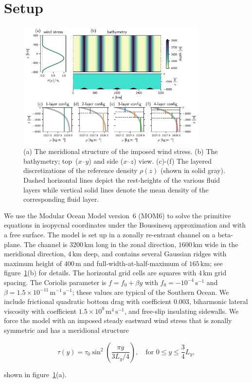 \documentclass{agujournal2019}
\begin{document}
\section{Setup}

\begin{figure}[t]
\centering
\noindent\includegraphics[width=0.85\textwidth]{domaindensities}
\vspace*{-1em}\caption{(a) The meridional structure of the imposed wind stress. (b) The bathymetry; top~($x$--$y$) and side ($x$--$z$) view. (c)-(f) The layered discretizations of the reference density $\rho(z)$ (shown in solid gray). Dashed horizontal lines depict the rest-heights of the various fluid layers while vertical solid lines denote the mean density of the corresponding fluid layer.}\label{fig:domain}\vspace*{-4em}
\end{figure}


We use the Modular Ocean Model version~6 (MOM6) to solve the primitive equations in isopycnal coordinates under the Boussinesq approximation and with a free surface. The model is set up in a zonally re-entrant channel on a beta-plane. The channel is $3200\,\mathrm{km}$ long in the zonal direction, $1600\,\mathrm{km}$ wide in the meridional direction, $4\,\mathrm{km}$ deep, and contains several Gaussian ridges with maximum height of $400\,\mathrm{m}$ and full-width-at-half-maximum of $165\,\mathrm{km}$; see figure~\ref{fig:domain}(b) for details. The horizontal grid cells are squares with $4\,\mathrm{km}$ grid spacing. The Coriolis parameter is $f=f_0+\beta y$ with $f_0=-10^{-4}\,\mathrm{s}^{-1}$ and $\beta=1.5\times 10^{-11}\,\mathrm{m}^{-1}\,\mathrm{s}^{-1}$; these values are typical of the Southern Ocean. We include frictional quadratic bottom drag {\color{black}with coefficient 0.003}, biharmonic lateral viscosity {\color{black}with coefficient $1.5\times10^9\,\mathrm{m}^4\,\mathrm{s}^{-1}$}, and free-slip {\color{black}insulating} sidewalls. We force the model with an imposed steady eastward wind stress that is zonally symmetric and has a meridional structure 
\begin{linenomath*}
\begin{equation}
    \tau(y) = \tau_0 \sin^2 \left(\frac{\pi y}{3L_y/4}\right),\quad\text{for } 0\le y\le \frac{3}{4}L_y, \label{eq:windstress}
\end{equation} 
\end{linenomath*}
shown in figure~\ref{fig:domain}(a). 
\end{document}
